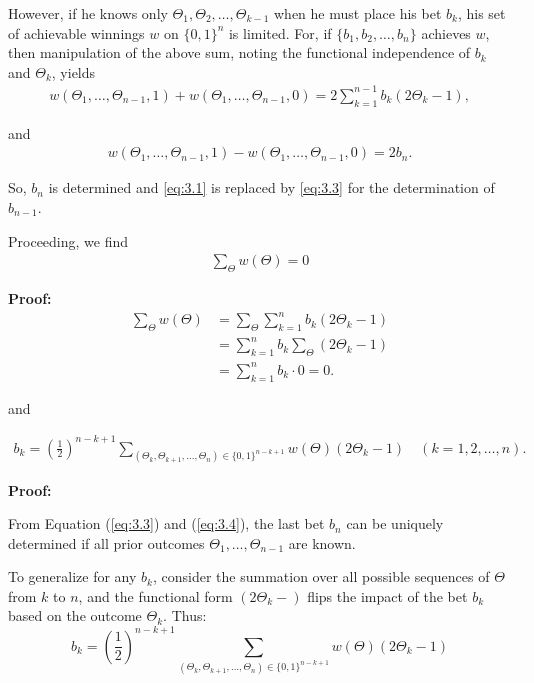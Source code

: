 \documentclass[11pt]{article}
\numberwithin{equation}{section}
\theoremstyle{boldStyle}
\begin{document}
However, if he knows only \(\Theta_1, \Theta_2, \ldots, \Theta_{k-1}\) when he must place his bet \(b_k\), his set of achievable winnings \(w\) on \(\{0, 1\}^n\) is limited. For, if \(\{b_1, b_2, \ldots, b_n\}\) achieves \(w\), then manipulation of the above sum, noting the functional independence of \(b_k\) and \(\Theta_k\), yields
\begin{align} \label{eq:3.3}
    w(\Theta_1, \ldots, \Theta_{n-1}, 1) + w(\Theta_1, \ldots, \Theta_{n-1}, 0) = 2 \sum_{k=1}^{n-1} b_k(2\Theta_k - 1),
\end{align}

and
\begin{align} \label{eq:3.4}
    w(\Theta_1, \ldots, \Theta_{n-1}, 1) - w(\Theta_1, \ldots, \Theta_{n-1}, 0) = 2b_n.
\end{align}

So, \(b_n\) is determined and \ref{eq:3.1} is replaced by \ref{eq:3.3} for the determination of \(b_{n-1}\). 

Proceeding, we find
\begin{align} \label{eq:3.5}
    \sum_{\Theta} w(\Theta) = 0
\end{align}

\textbf{Proof:}
\begin{align*}
    \sum_{\Theta} w(\Theta) &= \sum_{\Theta} \sum_{k=1}^n b_k(2\Theta_k - 1) \\
    &= \sum_{k=1}^n b_k \sum_{\Theta} (2\Theta_k - 1) \\
    &= \sum_{k=1}^n b_k \cdot 0 = 0.
\end{align*}

and 

\begin{align} \label{eq:3.6}
    b_k = (\frac{1}{2})^{n-k+1} \sum_{(\Theta_k, \Theta_{k+1}, \ldots, \Theta_n) \in \{0, 1\}^{n-k+1}} w(\Theta)(2\Theta_k - 1) \quad (k = 1, 2, \ldots, n).
\end{align}

\textbf{Proof:}

From Equation (\ref{eq:3.3}) and (\ref{eq:3.4}), the last bet \(b_n\) can be uniquely determined if all prior outcomes \(\Theta_1, \ldots, \Theta_{n-1}\) are known.

To generalize for any \(b_k\), consider the summation over all possible sequences of \(\Theta\) from \(k\) to \(n\), and the functional form \((2\Theta_k - )\) 
flips the impact of the bet \(b_k\) based on the outcome \(\Theta_k\). Thus:
\begin{equation*}
b_k = \left(\frac{1}{2}\right)^{n-k+1} \sum_{(\Theta_k, \Theta_{k+1}, \ldots, \Theta_n) \in \{0, 1\}^{n-k+1}} w(\Theta) (2\Theta_k - 1)
\end{equation*}
\end{document}
